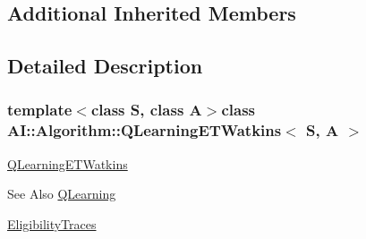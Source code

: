\subsection*{Additional Inherited Members}


\subsection{Detailed Description}
\subsubsection*{template$<$class S, class A$>$class A\-I\-::\-Algorithm\-::\-Q\-Learning\-E\-T\-Watkins$<$ S, A $>$}

\hyperlink{classAI_1_1Algorithm_1_1QLearningETWatkins}{Q\-Learning\-E\-T\-Watkins} \begin{DoxySeeAlso}{See Also}
\hyperlink{classAI_1_1Algorithm_1_1QLearning}{Q\-Learning} 

\hyperlink{classAI_1_1Algorithm_1_1EligibilityTraces}{Eligibility\-Traces} 
\end{DoxySeeAlso}


